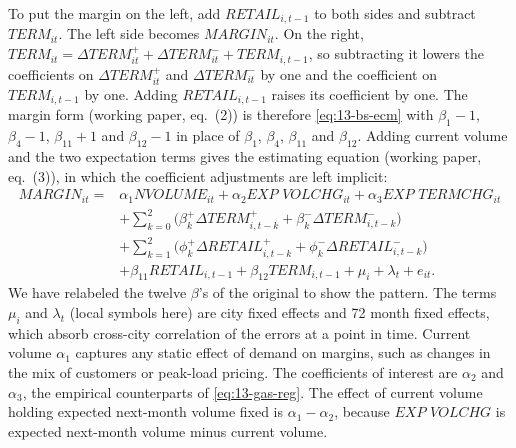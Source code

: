 To put the margin on the left, add $\textit{RETAIL}_{i,t-1}$ to both sides and subtract $\textit{TERM}_{it}$.
The left side becomes $\textit{MARGIN}_{it}$. On the right, $\textit{TERM}_{it}=\Delta\textit{TERM}^{+}_{it}+
\Delta\textit{TERM}^{-}_{it}+\textit{TERM}_{i,t-1}$, so subtracting it lowers the coefficients on
$\Delta\textit{TERM}^{+}_{it}$ and $\Delta\textit{TERM}^{-}_{it}$ by one and the coefficient on
$\textit{TERM}_{i,t-1}$ by one. Adding $\textit{RETAIL}_{i,t-1}$ raises its coefficient by one. The margin
form (working paper, eq.~(2)) is therefore \eqref{eq:13-bs-ecm} with $\beta_1-1$, $\beta_4-1$, $\beta_{11}+1$
and $\beta_{12}-1$ in place of $\beta_1$, $\beta_4$, $\beta_{11}$ and $\beta_{12}$. Adding current volume and the
two expectation terms gives the estimating equation (working paper, eq.~(3)), in which the coefficient
adjustments are left implicit:
\begin{equation}\label{eq:13-bs-main}
\begin{aligned}
\textit{MARGIN}_{it}={}&\alpha_1\textit{NVOLUME}_{it}+\alpha_2\textit{EXP VOLCHG}_{it}+\alpha_3\textit{EXP TERMCHG}_{it}\\
&+\sum_{k=0}^{2}\big(\beta^{+}_{k}\Delta\textit{TERM}^{+}_{i,t-k}+\beta^{-}_{k}\Delta\textit{TERM}^{-}_{i,t-k}\big)\\
&+\sum_{k=1}^{2}\big(\phi^{+}_{k}\Delta\textit{RETAIL}^{+}_{i,t-k}+\phi^{-}_{k}\Delta\textit{RETAIL}^{-}_{i,t-k}\big)\\
&+\beta_{11}\textit{RETAIL}_{i,t-1}+\beta_{12}\textit{TERM}_{i,t-1}+\mu_i+\lambda_t+e_{it}.
\end{aligned}
\end{equation}
We have relabeled the twelve $\beta$'s of the original to show the pattern. The terms $\mu_i$ and
$\lambda_t$ (local symbols here) are city fixed effects and 72 month fixed effects, which absorb cross-city correlation of the
errors at a point in time. Current volume $\alpha_1$ captures any static effect of demand on margins, such as
changes in the mix of customers or peak-load pricing. The coefficients of interest are $\alpha_2$ and
$\alpha_3$, the empirical counterparts of \eqref{eq:13-gas-reg}. The effect of current volume holding expected
next-month volume fixed is $\alpha_1-\alpha_2$, because $\textit{EXP VOLCHG}$ is expected next-month volume
minus current volume.

